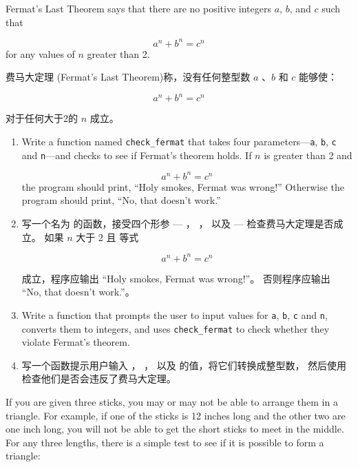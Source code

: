 {{{{\begin{exercise}

Fermat's Last Theorem says that there are no positive integers
$a$, $b$, and $c$ such that

\[ a^n + b^n = c^n \]
%
for any values of $n$ greater than 2.

费马大定理 (Fermat’s Last Theorem)称，没有任何整型数 $a$ 、$b$ 和 $c$ 能够使：

\[ a^n + b^n = c^n \]

对于任何大于2的 $n$ 成立。

\begin{enumerate}

\item Write a function named \verb"check_fermat" that takes four
parameters---{\tt a}, {\tt b}, {\tt c} and {\tt n}---and
checks to see if Fermat's theorem holds.  If
$n$ is greater than 2 and

\[a^n + b^n = c^n \]
%
the program should print, ``Holy smokes, Fermat was wrong!''
Otherwise the program should print, ``No, that doesn't work.''

\item 写一个名为  的函数，接受四个形参 --- ， ， 以及  --- 检查费马大定理是否成立。 如果 $n$ 大于 2 且 等式

\[a^n + b^n = c^n \]

成立，程序应输出 ``Holy smokes, Fermat was wrong!''。 否则程序应输出 ``No,
that doesn’t work.''。

\item Write a function that prompts the user to input values
for {\tt a}, {\tt b}, {\tt c} and {\tt n}, converts them to
integers, and uses \verb"check_fermat" to check whether they
violate Fermat's theorem.

\item 写一个函数提示用户输入 ， ， 以及  的值，将它们转换成整型数， 然后使用   检查他们是否会违反了费马大定理。

\end{enumerate}

\end{exercise}


\begin{exercise}

If you are given three sticks, you may or may not be able to arrange
them in a triangle.  For example, if one of the sticks is 12 inches
long and the other two are one inch long, you will
not be able to get the short sticks to meet in the middle.  For any
three lengths, there is a simple test to see if it is possible to form
a triangle:


\end{exercise}}}}}
